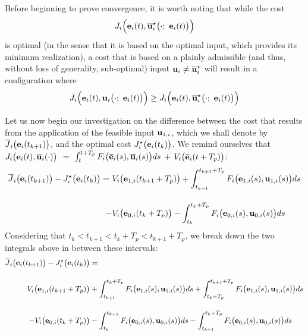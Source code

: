 Before beginning to prove convergence, it is worth noting that while the cost
$$J_i \Big(\vect{e}_i(t), \overline{\vect{u}}_i^{\star}\big(\cdot;\ \vect{e}_i(t)\big)\Big)$$
is optimal (in the sense that it is based on the optimal input, which provides
its minimum realization), a cost that is based on a plainly admissible
(and thus, without loss of generality, sub-optimal) input
$\bm{\mathbf{u}}_i \not= \overline{\bm{\mathbf{u}}}_i^{\star}$ will result in a configuration where
\begin{equation}
J_i \Big(\vect{e}_i(t), \vect{u}_i\big(\cdot;\ \vect{e}_i(t)\big)\Big)
\geq J_i \Big(\vect{e}_i(t), \overline{\vect{u}}_i^{\star}\big(\cdot;\ \vect{e}_i(t)\big)\Big)
\end{equation}

Let us now begin our investigation on the difference between the cost
that results from the application of the feasible input $\bm{\mathbf{u}}_{1,i}$,
which we shall denote by $\overline{J}_i\big(\bm{\mathbf{e}}_i(t_{k+1})\big)$,
and the optimal cost $J_i^{\star}\big(\bm{\mathbf{e}}_i(t_k)\big)$. We remind
ourselves that
$J_i \big(\bm{\mathbf{e}}_i(t), \overline{\bm{\mathbf{u}}}_i (\cdot)\big)$ $=$
$\int_{t}^{t + T_p} F_i \big(\overline{\bm{\mathbf{e}}}_i(s), \overline{\bm{\mathbf{u}}}_i (s)\big) ds$ $+$
$V_i \big(\overline{\bm{\mathbf{e}}}_i (t + T_p)\big)$:
\begin{align}
  \overline{J}_i\big(\bm{\mathbf{e}}_i(t_{k+1})\big) - J_i^{\star}\big(\bm{\mathbf{e}}_i(t_k)\big) =\
   & V_i \big(\bm{\mathbf{e}}_{1,i} (t_{k+1} + T_p)\big) + \int_{t_{k+1}}^{t_{k+1} + T_p} F_i \big(\bm{\mathbf{e}}_{1,i}(s), \bm{\mathbf{u}}_{1,i} (s)\big) ds \\[2.5ex]
  -&V_i \big(\bm{\mathbf{e}}_{0,i} (t_k + T_p)\big) - \int_{t_k}^{t_k + T_p} F_i \big(\bm{\mathbf{e}}_{0,i}(s), \bm{\mathbf{u}}_{0,i} (s)\big) ds
\end{align}
Considering that $t_k < t_{k+1} < t_k + T_p < t_{k+1} + T_p$, we break down the
two integrals above in between these intervals:
\begin{align}
  \overline{J}_i\big(\bm{\mathbf{e}}_i(t_{k+1})\big) - J_i^{\star}\big(\bm{\mathbf{e}}_i(t_k)\big) &= \\[2.5ex]
    V_i \big(\bm{\mathbf{e}}_{1,i} (t_{k+1} + T_p)\big)
    &+ \int_{t_{k+1}}^{t_k + T_p} F_i \big(\bm{\mathbf{e}}_{1,i}(s), \bm{\mathbf{u}}_{1,i} (s)\big) d s
    + \int_{t_k + T_p}^{t_{k+1} + T_p} F_i \big(\bm{\mathbf{e}}_{1,i}(s), \bm{\mathbf{u}}_{1,i} (s)\big) d s \\[2.5ex]
    -V_i \big(\bm{\mathbf{e}}_{0,i} (t_k + T_p)\big)
    &- \int_{t_k}^{t_{k+1}} F_i \big(\bm{\mathbf{e}}_{0,i}(s), \bm{\mathbf{u}}_{0,i} (s)\big) d s
    - \int_{t_{k+1}}^{t_k + T_p} F_i \big(\bm{\mathbf{e}}_{0,i}(s), \bm{\mathbf{u}}_{0,i} (s)\big) d s
\label{eq:convergence_4_integrals}
\end{align}

